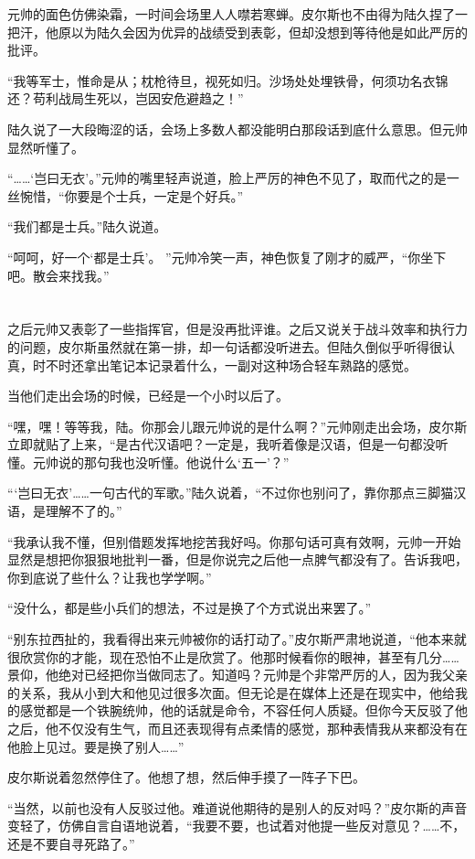 元帅的面色仿佛染霜，一时间会场里人人噤若寒蝉。皮尔斯也不由得为陆久捏了一把汗，他原以为陆久会因为优异的战绩受到表彰，但却没想到等待他是如此严厉的批评。

“我等军士，惟命是从；枕枪待旦，视死如归。沙场处处埋铁骨，何须功名衣锦还？苟利战局生死以，岂因安危避趋之！”

陆久说了一大段晦涩的话，会场上多数人都没能明白那段话到底什么意思。但元帅显然听懂了。

“……‘岂曰无衣’。”元帅的嘴里轻声说道，脸上严厉的神色不见了，取而代之的是一丝惋惜，“你要是个士兵，一定是个好兵。”

“我们都是士兵。”陆久说道。

“呵呵，好一个‘都是士兵’。 ”元帅冷笑一声，神色恢复了刚才的威严，“你坐下吧。散会来找我。”
\section*{}

之后元帅又表彰了一些指挥官，但是没再批评谁。之后又说关于战斗效率和执行力的问题，皮尔斯虽然就在第一排，却一句话都没听进去。但陆久倒似乎听得很认真，时不时还拿出笔记本记录着什么，一副对这种场合轻车熟路的感觉。

当他们走出会场的时候，已经是一个小时以后了。

“嘿，嘿！等等我，陆。你那会儿跟元帅说的是什么啊？”元帅刚走出会场，皮尔斯立即就贴了上来，“是古代汉语吧？一定是，我听着像是汉语，但是一句都没听懂。元帅说的那句我也没听懂。他说什么‘五一’？”

“‘岂曰无衣’……一句古代的军歌。”陆久说着，“不过你也别问了，靠你那点三脚猫汉语，是理解不了的。”

“我承认我不懂，但别借题发挥地挖苦我好吗。你那句话可真有效啊，元帅一开始显然是想把你狠狠地批判一番，但是你说完之后他一点脾气都没有了。告诉我吧，你到底说了些什么？让我也学学啊。”

“没什么，都是些小兵们的想法，不过是换了个方式说出来罢了。”

“别东拉西扯的，我看得出来元帅被你的话打动了。”皮尔斯严肃地说道，“他本来就很欣赏你的才能，现在恐怕不止是欣赏了。他那时候看你的眼神，甚至有几分……景仰，他绝对已经把你当做同志了。知道吗？元帅是个非常严厉的人，因为我父亲的关系，我从小到大和他见过很多次面。但无论是在媒体上还是在现实中，他给我的感觉都是一个铁腕统帅，他的话就是命令，不容任何人质疑。但你今天反驳了他之后，他不仅没有生气，而且还表现得有点柔情的感觉，那种表情我从来都没有在他脸上见过。要是换了别人……”

皮尔斯说着忽然停住了。他想了想，然后伸手摸了一阵子下巴。

“当然，以前也没有人反驳过他。难道说他期待的是别人的反对吗？”皮尔斯的声音变轻了，仿佛自言自语地说着，“我要不要，也试着对他提一些反对意见？……不，还是不要自寻死路了。”

